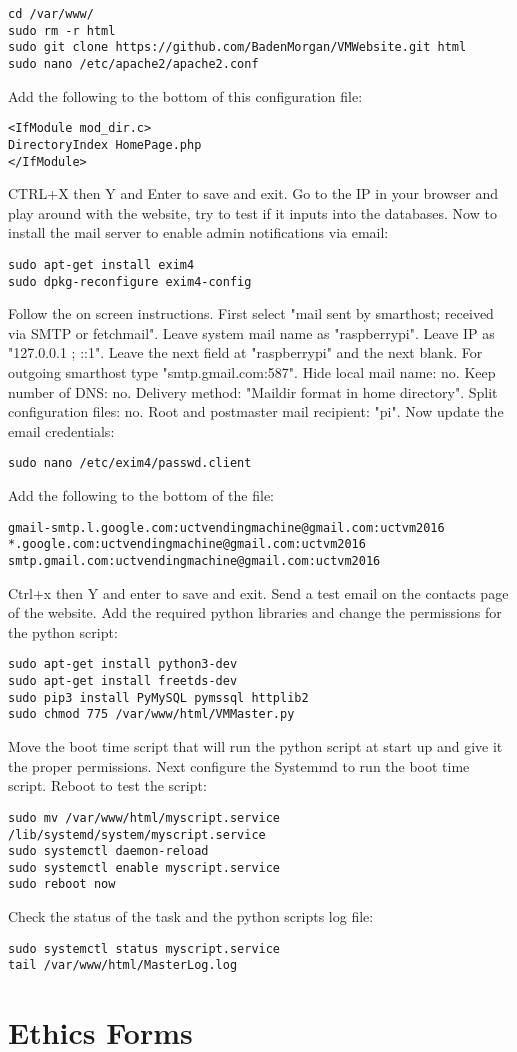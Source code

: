 \documentclass[a4paper,11pt]{article}
\numberwithin{figure}{section}
\numberwithin{table}{section}
\begin{document}
\begin{appendices}
\begin{lstlisting}[firstnumber=16]
cd /var/www/
sudo rm -r html
sudo git clone https://github.com/BadenMorgan/VMWebsite.git html
sudo nano /etc/apache2/apache2.conf
\end{lstlisting}
Add the following to the bottom of this configuration file:
\begin{lstlisting}[firstnumber=20]
<IfModule mod_dir.c>
DirectoryIndex HomePage.php
</IfModule>
\end{lstlisting}
CTRL+X then Y and Enter to save and exit. Go to the IP in your browser and play around with the website, try to test if it inputs into the databases. Now to install the mail server to enable admin notifications via email:
\begin{lstlisting}[firstnumber=23]
sudo apt-get install exim4
sudo dpkg-reconfigure exim4-config
\end{lstlisting}
Follow the on screen instructions. First select "mail sent by smarthost; received via SMTP or fetchmail". Leave system mail name as "raspberrypi". Leave IP as "127.0.0.1 ; ::1". Leave the next field at "raspberrypi" and the next blank. For outgoing smarthost type "smtp.gmail.com:587". Hide local mail name: no. Keep number of DNS: no. Delivery method: "Maildir format in home directory". Split configuration files: no. Root and postmaster mail recipient: "pi". Now update the email credentials:
\begin{lstlisting}[firstnumber=25]
sudo nano /etc/exim4/passwd.client
\end{lstlisting}
Add the following to the bottom of the file:
\begin{lstlisting}[firstnumber=26]
gmail-smtp.l.google.com:uctvendingmachine@gmail.com:uctvm2016
*.google.com:uctvendingmachine@gmail.com:uctvm2016
smtp.gmail.com:uctvendingmachine@gmail.com:uctvm2016
\end{lstlisting}
Ctrl+x then Y and enter to save and exit. Send a test email on the contacts page of the website. Add the required python libraries and change the permissions for the python script:
\begin{lstlisting}[firstnumber=29]
sudo apt-get install python3-dev
sudo apt-get install freetds-dev
sudo pip3 install PyMySQL pymssql httplib2
sudo chmod 775 /var/www/html/VMMaster.py
\end{lstlisting}
Move the boot time script that will run the python script at start up and give it the proper permissions. Next configure the Systemmd to run the boot time script. Reboot to test the script:
\begin{lstlisting}[firstnumber=33]
sudo mv /var/www/html/myscript.service /lib/systemd/system/myscript.service
sudo systemctl daemon-reload
sudo systemctl enable myscript.service
sudo reboot now
\end{lstlisting}
Check the status of the task and the python scripts log file:
\begin{lstlisting}[firstnumber=37]
sudo systemctl status myscript.service
tail /var/www/html/MasterLog.log
\end{lstlisting}

\newpage

\section{Ethics Forms}
\end{appendices}
\end{document}
